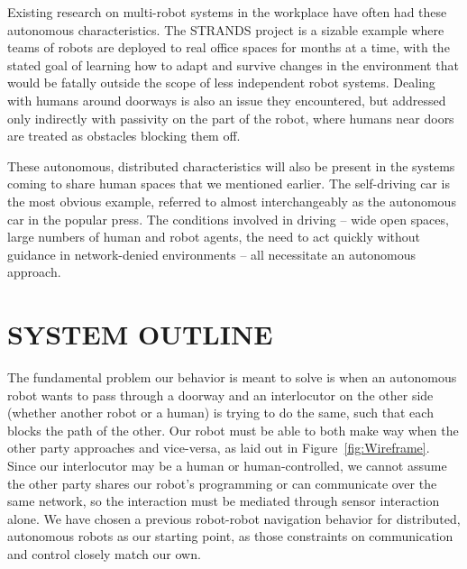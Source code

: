 \documentclass[letterpaper, 10 pt, conference]{ieeeconf}  %
\begin{document}

Existing research on multi-robot systems in the workplace have often had these autonomous characteristics. The STRANDS project\cite{c11} is a sizable example where teams of robots are deployed to real office spaces for months at a time, with the stated goal of learning how to adapt and survive changes in the environment that would be fatally outside the scope of less independent robot systems. Dealing with humans around doorways is also an issue they encountered, but addressed only indirectly with passivity on the part of the robot, where humans near doors are treated as obstacles blocking them off.

These autonomous, distributed characteristics will also be present in the systems coming to share human spaces that we mentioned earlier. The self-driving car is the most obvious example, referred to almost interchangeably as the autonomous car in the popular press\cite{c12}. The conditions involved in driving – wide open spaces, large numbers of human and robot agents, the need to act quickly without guidance in network-denied environments – all necessitate an autonomous approach.


\section{SYSTEM OUTLINE}

The fundamental problem our behavior is meant to solve is when an autonomous robot wants to pass through a doorway and an interlocutor on the other side (whether another robot or a human) is trying to do the same, such that each blocks the path of the other. Our robot must be able to both make way when the other party approaches and vice-versa, as laid out in Figure~\ref{fig:Wireframe}. Since our interlocutor may be a human or human-controlled, we cannot assume the other party shares our robot’s programming or can communicate over the same network, so the interaction must be mediated through sensor interaction alone. We have chosen a previous robot-robot navigation behavior for distributed, autonomous robots as our starting point, as those constraints on communication and control closely match our own.
\end{document}
